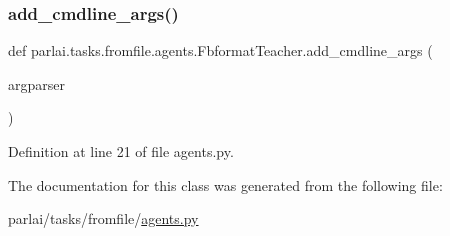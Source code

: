 \subsubsection{\texorpdfstring{add\+\_\+cmdline\+\_\+args()}{add\_cmdline\_args()}}
{\footnotesize\ttfamily def parlai.\+tasks.\+fromfile.\+agents.\+Fbformat\+Teacher.\+add\+\_\+cmdline\+\_\+args (\begin{DoxyParamCaption}\item[{}]{argparser }\end{DoxyParamCaption})\hspace{0.3cm}{\ttfamily [static]}}



Definition at line 21 of file agents.\+py.



The documentation for this class was generated from the following file\+:\begin{DoxyCompactItemize}
\item 
parlai/tasks/fromfile/\hyperlink{parlai_2tasks_2fromfile_2agents_8py}{agents.\+py}\end{DoxyCompactItemize}
